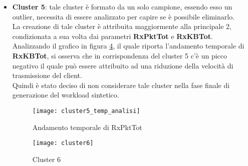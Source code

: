 \begin{itemize}
  \begin{figure}[!htbp]
    \centering
    \texttt{[image: cluster41]}
    \caption{Cluster 4.1}
    \label{webserver_cluster41}
  \end{figure}

  \begin{figure}[!htbp]
    \centering
    \texttt{[image: cluster42]}
    \caption{Cluster 4.2}
    \label{webserver_cluster42}
  \end{figure}

  \clearpage

  \begin{figure}[!htbp]
    \centering
    \texttt{[image: cluster5]}
    \caption{Cluster 5}
    \label{webserver_cluster5}
  \end{figure}

  \item \textbf{Cluster 5}: tale cluster è formato da un solo campione, essendo
  esso un outlier, necessita di essere analizzato per capire se è possibile eliminarlo.\\
  La creazione di tale cluster è attribuita maggiormente alla principale
  2, condizionata a sua volta dai parametri \textbf{RxPktTot} e \textbf{RxKBTot}.\\
  Analizzando il grafico in figura \ref{webserver_cluster5_temp_analisi}, il quale riporta
  l'andamento temporale di \textbf{RxKBTot}, si osserva che in corrispondenza del
  cluster 5 c'è un picco negativo il quale può essere attribuito ad una riduzione
  della velocità di trasmissione del client.\\
  Quindi è stato deciso di non considerare tale cluster nella fase finale di
  generazione del workload sintetico.\\

  \begin{figure}[!htbp]
    \centering
    \texttt{[image: cluster5\_temp\_analisi]}
    \caption{Andamento temporale di RxPktTot}
    \label{webserver_cluster5_temp_analisi}
  \end{figure}

  \clearpage

  \begin{figure}[!htbp]
    \centering
    \texttt{[image: cluster6]}
    \caption{Cluster 6}
    \label{webserver_cluster6}
  \end{figure}


\end{itemize}
